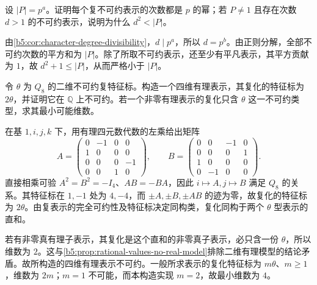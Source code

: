 \begin{exercise}\label{b5:ex:05-p-group-degrees}
	设 \(|P|=p^a\)。证明每个复不可约表示的次数都是 \(p\) 的幂；若 \(P\ne1\) 且存在次数 \(d>1\) 的不可约表示，说明为什么 \(d^2<|P|\)。
\end{exercise}
\begin{solution}
	由\cref{b5:cor:character-degree-divisibility}，\(d\mid p^a\)，所以 \(d=p^b\)。由正则分解，全部不可约次数的平方和为 \(|P|\)。除了所取不可约表示，还至少有平凡表示，其平方贡献为 \(1\)，故 \(d^2+1\le|P|\)，从而严格小于 \(|P|\)。
\end{solution}

\begin{exercise}\label{b5:ex:05-rational-values-no-real-model}
	令 \(\theta\) 为 \(Q_8\) 的二维不可约复特征标。构造一个四维有理表示，其复化的特征标为 \(2\theta\)，并证明它在 \(\mathbb Q\) 上不可约。若一个非零有理表示的复化只含 \(\theta\) 这一不可约类型，求其最小可能维数。
\end{exercise}
\begin{solution}
	在基 \(1,i,j,k\) 下，用有理四元数代数的左乘给出矩阵
	\[
		A=\begin{pmatrix}0&-1&0&0\\1&0&0&0\\0&0&0&-1\\0&0&1&0\end{pmatrix},\qquad
		B=\begin{pmatrix}0&0&-1&0\\0&0&0&1\\1&0&0&0\\0&-1&0&0\end{pmatrix}.
	\]
	直接相乘可验 \(A^2=B^2=-I_4\)、\(AB=-BA\)，因此 \(i\mapsto A,j\mapsto B\) 满足 \(Q_8\) 的关系。其特征标在 \(1,-1\) 处为 \(4,-4\)，而 \(\pm A,\pm B,\pm AB\) 的迹为零，故复化的特征标为 \(2\theta\)。由复表示的完全可约性及特征标决定同构类，复化同构于两个 \(\theta\) 型表示的直和。

	若有非零真有理子表示，其复化是这个直和的非零真子表示，必只含一份 \(\theta\)，所以维数为 \(2\)。这与\cref{b5:prop:rational-values-no-real-model}排除二维有理模型的结论矛盾。故所构造的四维有理表示不可约。一般所求表示的复化特征标为 \(m\theta\)、\(m\ge1\)，维数为 \(2m\)；\(m=1\) 不可能，而本构造实现 \(m=2\)，故最小维数为 \(4\)。
\end{solution}

